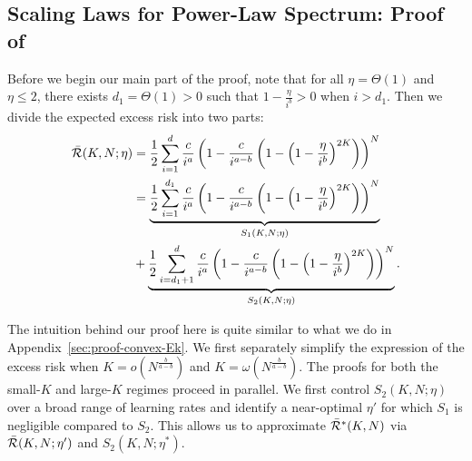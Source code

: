 \subsection{Scaling Laws for Power-Law Spectrum: Proof of }\label{sec:proof-one-hot-scaling-law-power-spectrum}

Before we begin our main part of the proof, note that for all $\eta=\Theta(1)$ and $\eta\leq 2$, there exists $d_1=\Theta(1)>0$ such that $1-\frac{\eta}{i^b}>0$ when $i>d_1$. Then we divide the expected excess risk into two parts:
\begin{align*}
    \Bar{\mathcal{R}}(K, N;\eta)&=\frac{1}{2}\sum_{i=1}^{d}\frac{c}{i^{a}}\left(1-\frac{c}{i^{a-b}}\left(1-\left(1-\frac{\eta}{i^b}\right)^{2K}\right)\right)^N \\
    &=\underbrace{\frac{1}{2}\sum_{i=1}^{d_1}\frac{c}{i^{a}}\left(1-\frac{c}{i^{a-b}}\left(1-\left(1-\frac{\eta}{i^b}\right)^{2K}\right)\right)^N}_{S_1(K, N; \eta)} \\
    &+\underbrace{\frac{1}{2}\sum_{i=d_1+1}^{d}\frac{c}{i^{a}}\left(1-\frac{c}{i^{a-b}}\left(1-\left(1-\frac{\eta}{i^b}\right)^{2K}\right)\right)^N}_{S_2(K, N; \eta)}.
\end{align*}


The intuition behind our proof here is quite similar to what we do in Appendix~\ref{sec:proof-convex-Ek}. We first separately simplify the expression of the excess risk when $K=o(N^{\frac{b}{a-b}})$ and $K=\omega(N^{\frac{b}{a-b}})$. The proofs for both the small-$K$ and large-$K$ regimes proceed in parallel. We first control $S_2(K,N;\eta)$ over a broad range of learning rates and identify a near-optimal $\eta'$ for which $S_1$ is negligible compared to $S_2$. This allows us to approximate $\Bar{\mathcal{R}}^*(K,N)$ via $\Bar{\mathcal{R}}(K,N;\eta')$ and $S_2(K,N;\eta^*)$. 

